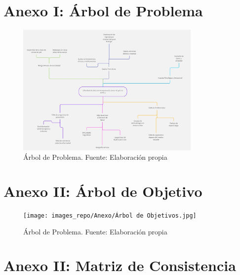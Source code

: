 \chapter{Anexo I: Árbol de Problema }

\begin{figure}[h]
	\begin{center}
		\includegraphics[width=0.8\textwidth]{images_repo/Anexo/Problem Tree Template.jpg}
		\caption{Árbol de Problema. Fuente: Elaboración propia}
		\label{1:arbolProblema}
	\end{center}
\end{figure}



\chapter{Anexo II: Árbol de Objetivo}

\begin{figure}[h]
	\begin{center}
		\texttt{[image: images\_repo/Anexo/Árbol de Objetivos.jpg]}
		\caption{Árbol de Problema. Fuente: Elaboración propia}
		\label{1:arbolObjeti}
	\end{center}
\end{figure}



\chapter{Anexo II: Matriz de Consistencia}


